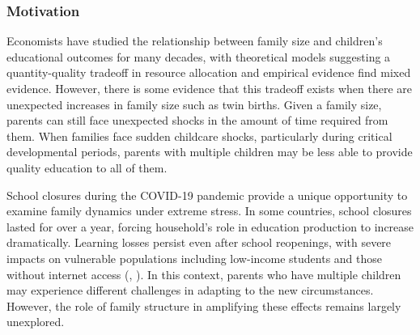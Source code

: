 





\subsubsection{Motivation}

Economists have studied the relationship between family size and children's educational outcomes for many decades, with theoretical models suggesting a quantity-quality tradeoff in resource allocation and empirical evidence find mixed evidence. However, there is some evidence that this tradeoff exists when there are unexpected increases in family size such as twin births. Given a family size, parents can still face unexpected shocks in the amount of time required from them. When families face sudden childcare shocks, particularly during critical developmental periods, parents with multiple children may be less able to provide quality education to all of them.


School closures during the COVID-19 pandemic provide a unique opportunity to examine family dynamics under extreme stress. In some countries, school closures lasted for over a year, forcing household's role in education production to increase dramatically. Learning losses persist even after school reopenings, with severe impacts on vulnerable populations including low-income students and those without internet access (\cite{haelermans_inequality_2022}, \cite{jakubowski_global_2023}). In this context, parents who have multiple children may experience different challenges in adapting to the new circumstances. However, the role of family structure in amplifying these effects remains largely unexplored.\textbf{}

